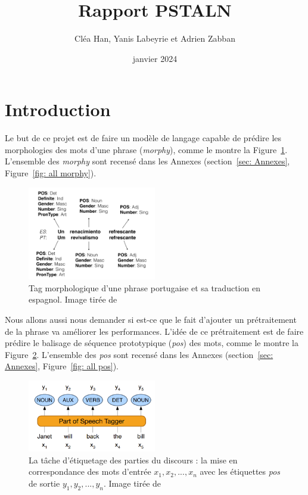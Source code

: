 \documentclass[a4paper]{article}
\title{Rapport PSTALN}
\author{Cléa Han, Yanis Labeyrie et Adrien Zabban}
\date{janvier 2024}
\begin{document}
\maketitle
\bigskip
\tableofcontents
\newpage

\section{Introduction}

Le but de ce projet est de faire un modèle de langage capable de prédire les morphologies des mots d'une phrase
(\textit{morphy}), comme le montre la Figure~\ref{fig: example morphy}. L'ensemble des \textit{morphy} 
sont recensé dans les Annexes (section~\ref{sec: Annexes}, Figure~\ref{fig: all morphy}).

\begin{figure}[H]
    \centering
    \includegraphics[width=0.5\textwidth]{morphy.png}
    \caption{Tag morphologique d'une phrase portugaise et sa traduction en espagnol.
    Image tirée de~\cite{malaviya-etal-2018-neural}}
    \label{fig: example morphy}
\end{figure}    

Nous allons aussi nous demander si est-ce que le fait d'ajouter un prétraitement de la phrase va améliorer
les performances. L'idée de ce prétraitement est de faire prédire le balisage de séquence
prototypique (\textit{pos}) des mots, comme le montre la Figure~\ref{fig: example pos}. L'ensemble des \textit{pos} 
sont recensé dans les Annexes (section~\ref{sec: Annexes}, Figure~\ref{fig: all pos}).

\begin{figure}[H]
    \centering
    \includegraphics[width=0.5\textwidth]{pos.png}
    \caption{La tâche d'étiquetage des parties du discours : la mise en correspondance des mots d'entrée 
    $x_1, x_2,..., x_n$ avec les étiquettes \textit{pos} de sortie $y_1, y_2,..., y_n$.
    Image tirée de~\cite{pos}}
    \label{fig: example pos}
\end{figure} 
\end{document}
